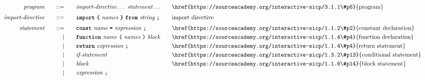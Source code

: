 \begin{alignat*}{9}
&& \textit{program}    &&\quad ::= &\quad && \textit{import-directive} \ldots \ \textit{statement} \ldots
                                                           && \textrm{\href{https://sourceacademy.org/interactive-sicp/3.1.1\#p6}{program}} \\[1mm]
&& \textit{import-directive}    &&\quad ::= &\quad && \textbf{\texttt{import}}\ \textbf{\texttt{\{}}\ \textit{names} \ \textbf{\texttt{\}}}\ \textbf{\texttt{from}}\  \textit{string} \ \textbf{\texttt{;}}
                                                           && \textrm{import directive} \\[1mm]
&& \textit{statement}    &&\quad ::= &\quad && \textbf{\texttt{const}}\  \textit{name} \ 
                                           \textbf{\texttt{=}}\  \textit{expression} \ \textbf{\texttt{;}}
                                                           && \textrm{\href{https://sourceacademy.org/interactive-sicp/1.1.2\#p2}{constant declaration}} \\
&&                       && |   &\quad && \textbf{\texttt{function}}\  \textit{name} \ 
                                   \textbf{\texttt{(}}\  \textit{names} \ \textbf{\texttt{)}}\ \textit{block} \quad
                                                           && \textrm{\href{https://sourceacademy.org/interactive-sicp/1.1.4\#p4}{function declaration}}\\
&&                       && |   &\quad && \textbf{\texttt{return}}\  \textit{expression} \ \textbf{\texttt{;}}
                                                           && \textrm{\href{https://sourceacademy.org/interactive-sicp/1.1.4\#p4}{return statement}}\\
&&                       && |   &\quad && \textit{if-statement} \quad
                                                           && \textrm{\href{https://sourceacademy.org/interactive-sicp/1.3.2\#p13}{conditional statement}}\\
&&                       && |   &\quad &&  \textit{block} 
                                                           && \textrm{\href{https://sourceacademy.org/interactive-sicp/1.1.8\#p14}{block statement}}\\
&&                       && |   &\quad &&  \textit{expression} \ \textbf{\texttt{;}}

\end{alignat*}
